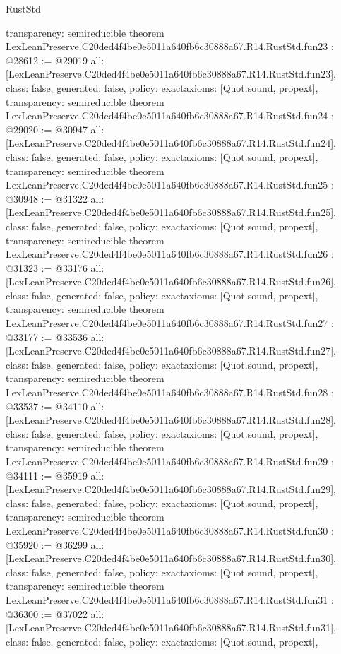 \begin{lexlean}{RustStd}
\begin{coremodule}
{  transparency: semireducible
}
theorem LexLeanPreserve.C20ded4f4be0e5011a640fb6c30888a67.R14.RustStd.fun23 : @28612 := @29019 {
  all: [LexLeanPreserve.C20ded4f4be0e5011a640fb6c30888a67.R14.RustStd.fun23],
  class: false,
  generated: false,
  policy: exact{axioms: [Quot.sound, propext]},
  transparency: semireducible
}
theorem LexLeanPreserve.C20ded4f4be0e5011a640fb6c30888a67.R14.RustStd.fun24 : @29020 := @30947 {
  all: [LexLeanPreserve.C20ded4f4be0e5011a640fb6c30888a67.R14.RustStd.fun24],
  class: false,
  generated: false,
  policy: exact{axioms: [Quot.sound, propext]},
  transparency: semireducible
}
theorem LexLeanPreserve.C20ded4f4be0e5011a640fb6c30888a67.R14.RustStd.fun25 : @30948 := @31322 {
  all: [LexLeanPreserve.C20ded4f4be0e5011a640fb6c30888a67.R14.RustStd.fun25],
  class: false,
  generated: false,
  policy: exact{axioms: [Quot.sound, propext]},
  transparency: semireducible
}
theorem LexLeanPreserve.C20ded4f4be0e5011a640fb6c30888a67.R14.RustStd.fun26 : @31323 := @33176 {
  all: [LexLeanPreserve.C20ded4f4be0e5011a640fb6c30888a67.R14.RustStd.fun26],
  class: false,
  generated: false,
  policy: exact{axioms: [Quot.sound, propext]},
  transparency: semireducible
}
theorem LexLeanPreserve.C20ded4f4be0e5011a640fb6c30888a67.R14.RustStd.fun27 : @33177 := @33536 {
  all: [LexLeanPreserve.C20ded4f4be0e5011a640fb6c30888a67.R14.RustStd.fun27],
  class: false,
  generated: false,
  policy: exact{axioms: [Quot.sound, propext]},
  transparency: semireducible
}
theorem LexLeanPreserve.C20ded4f4be0e5011a640fb6c30888a67.R14.RustStd.fun28 : @33537 := @34110 {
  all: [LexLeanPreserve.C20ded4f4be0e5011a640fb6c30888a67.R14.RustStd.fun28],
  class: false,
  generated: false,
  policy: exact{axioms: [Quot.sound, propext]},
  transparency: semireducible
}
theorem LexLeanPreserve.C20ded4f4be0e5011a640fb6c30888a67.R14.RustStd.fun29 : @34111 := @35919 {
  all: [LexLeanPreserve.C20ded4f4be0e5011a640fb6c30888a67.R14.RustStd.fun29],
  class: false,
  generated: false,
  policy: exact{axioms: [Quot.sound, propext]},
  transparency: semireducible
}
theorem LexLeanPreserve.C20ded4f4be0e5011a640fb6c30888a67.R14.RustStd.fun30 : @35920 := @36299 {
  all: [LexLeanPreserve.C20ded4f4be0e5011a640fb6c30888a67.R14.RustStd.fun30],
  class: false,
  generated: false,
  policy: exact{axioms: [Quot.sound, propext]},
  transparency: semireducible
}
theorem LexLeanPreserve.C20ded4f4be0e5011a640fb6c30888a67.R14.RustStd.fun31 : @36300 := @37022 {
  all: [LexLeanPreserve.C20ded4f4be0e5011a640fb6c30888a67.R14.RustStd.fun31],
  class: false,
  generated: false,
  policy: exact{axioms: [Quot.sound, propext]},
}
\end{coremodule}
\end{lexlean}
